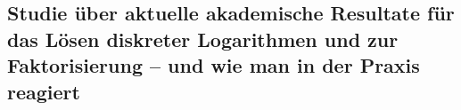 \begin{refsegment}
\chapter%
{Studie über aktuelle akademische Resultate für das Lösen diskreter Logarithmen und zur Faktorisierung -- und wie man in der Praxis reagiert}
%
%

\end{refsegment}
